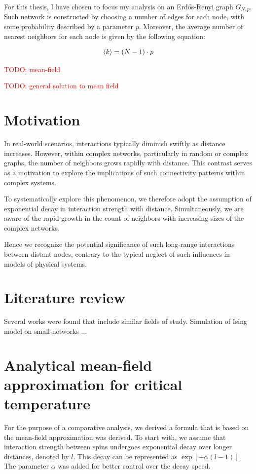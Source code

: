\documentclass[11pt,a4paper]{article}
\newcommand{\todo}[1]{\textcolor{red}{TODO: #1}}
\begin{document}
For this thesis, I have chosen to focus my analysis on an Erdős-Renyi graph $G_{N,p}$. Such network is constructed by choosing a number of edges for each node, with some probability described by a parameter $p$. Moreover, the average number of nearest neighbors for each node is given by the following equation:

\begin{equation}
    \braket{k} = (N-1) \cdot p
\end{equation}

\todo{mean-field}

\todo{general solution to mean field}


\section{Motivation}

In real-world scenarios, interactions typically diminish swiftly as distance increases. However, within complex networks, particularly in random or complex graphs, the number of neighbors grows rapidly with distance. This contrast serves as a motivation to explore the implications of such connectivity patterns within complex systems.

To systematically explore this phenomenon, we therefore adopt the assumption of exponential decay in interaction strength with distance. Simultaneously, we are aware of the rapid growth in the count of neighbors with increasing sizes of the complex networks.

Hence we recognize the potential significance of such long-range interactions between distant nodes, contrary to the typical neglect of such influences in models of physical systems.


\section{Literature review}

Several works were found that include similar fields of study. 
Simulation of Ising model on small-networks ...


\section{Analytical mean-field approximation for critical temperature}

For the purpose of a comparative analysis, we derived a formula that is based on the mean-field approximation was derived. To start with, we assume that interaction strength between spins undergoes exponential decay over longer distances, denoted by $l$. This decay can be represented as $\exp[-\alpha (l-1)]$. The parameter $\alpha$ was added for better control over the decay speed.
\end{document}
